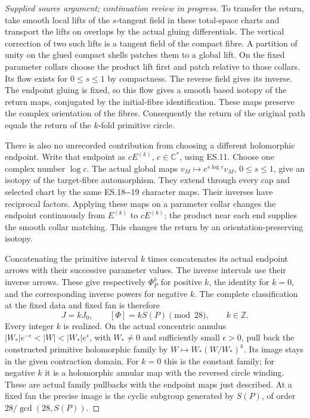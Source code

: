 \begin{proof}[Supplied source argument; continuation review in progress]
To transfer the return, take smooth local lifts of the
\(s\)-tangent field in these total-space charts and
transport the lifts on overlaps by the actual gluing
differentials. The vertical correction of two such
lifts is a tangent field of the compact fibre. A
partition of unity on the glued compact shells patches
them to a global lift. On the fixed parameter collars
choose the product lift first and patch relative to
those collars. Its flow exists for \(0\le s\le1\)
by compactness. The reverse field gives its inverse.
The endpoint gluing is fixed, so this flow gives a
smooth based isotopy of the return maps, conjugated
by the initial-fibre identification. These maps
preserve the complex orientation of the fibres.
Consequently the return of the original path equals
the return of the \(k\)-fold primitive circle.

There is also no unrecorded contribution from choosing
a different holomorphic endpoint. Write that endpoint
as \(cE^{(k)}\), \(c\in\mathbb C^*\), using ES.11.
Choose one complex number \(\log c\). The actual global
maps \(v_M\mapsto e^{s\log c}v_M\), \(0\le s\le1\),
give an isotopy of the target-fibre automorphism.
They extend through every cap and selected chart by
the same ES.18-\/-19 character maps. Their inverses
have reciprocal factors. Applying these maps on a
parameter collar changes the endpoint continuously
from \(E^{(k)}\) to \(cE^{(k)}\); the product near each
end supplies the smooth collar matching. This
changes the return by an orientation-preserving
isotopy.

Concatenating the primitive interval \(k\) times
concatenates its actual endpoint arrows with their
successive parameter values. The inverse intervals
use their inverse arrows. These give respectively
\(\Phi_P^k\) for positive \(k\), the identity for
\(k=0\), and the corresponding inverse powers for
negative \(k\). The complete classification at the
fixed data and fixed fan is therefore
\[
 \boxed{\quad J=kJ_0,\qquad [\Phi]=kS(P)\pmod {28},
       \qquad k\in\mathbb Z .\quad}
 \tag{ES.37}
\]
Every integer \(k\) is realized. On the actual concentric
annulus \(|W_*|e^{-\epsilon}<|W|<|W_*|e^\epsilon\),
with \(W_*\ne0\) and sufficiently small \(\epsilon>0\), pull back
the constructed primitive holomorphic family by
\(W\mapsto W_*(W/W_*)^k\). Its image stays in the
given contraction domain. For \(k=0\) this is the
constant family; for negative \(k\) it is a holomorphic
annular map with the reversed circle winding.
These are actual family pullbacks with the endpoint
maps just described. At a fixed fan the precise image
is the cyclic subgroup generated by \(S(P)\), of order
\(28/\gcd(28,S(P))\).


\end{proof}
